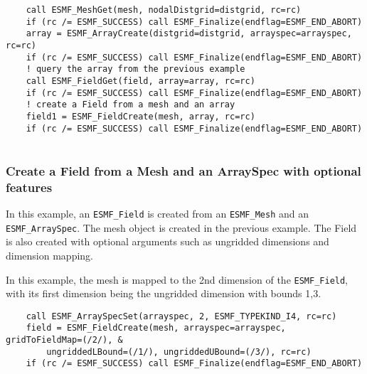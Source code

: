 
 \begin{verbatim}
    call ESMF_MeshGet(mesh, nodalDistgrid=distgrid, rc=rc)
    if (rc /= ESMF_SUCCESS) call ESMF_Finalize(endflag=ESMF_END_ABORT)
    array = ESMF_ArrayCreate(distgrid=distgrid, arrayspec=arrayspec, rc=rc)
    if (rc /= ESMF_SUCCESS) call ESMF_Finalize(endflag=ESMF_END_ABORT)
    ! query the array from the previous example
    call ESMF_FieldGet(field, array=array, rc=rc)
    if (rc /= ESMF_SUCCESS) call ESMF_Finalize(endflag=ESMF_END_ABORT)
    ! create a Field from a mesh and an array
    field1 = ESMF_FieldCreate(mesh, array, rc=rc)
    if (rc /= ESMF_SUCCESS) call ESMF_Finalize(endflag=ESMF_END_ABORT)
 
\end{verbatim}
 

  \subsubsection{Create a Field from a Mesh and an ArraySpec with optional features}
  \label{sec:field:usage:createMeshArrayspecOpt}
  
   In this example, an {\tt ESMF\_Field} is created from an {\tt ESMF\_Mesh}
   and an {\tt ESMF\_ArraySpec}. The mesh object is created in the previous example.
   The Field is also created with optional arguments such as ungridded dimensions
   and dimension mapping.
  
   In this example, the mesh is mapped to the 2nd dimension of the
   {\tt ESMF\_Field}, with its first dimension being the ungridded dimension with bounds 1,3.
   

 \begin{verbatim}
    call ESMF_ArraySpecSet(arrayspec, 2, ESMF_TYPEKIND_I4, rc=rc)
    field = ESMF_FieldCreate(mesh, arrayspec=arrayspec, gridToFieldMap=(/2/), &
        ungriddedLBound=(/1/), ungriddedUBound=(/3/), rc=rc)
    if (rc /= ESMF_SUCCESS) call ESMF_Finalize(endflag=ESMF_END_ABORT)
 
\end{verbatim}

\setlength{\parskip}{\oldparskip}
\setlength{\parindent}{\oldparindent}
\setlength{\baselineskip}{\oldbaselineskip}
